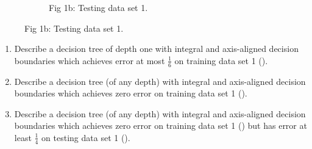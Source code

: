 \begin{enumerate}[font={\Large\bfseries},left=0pt]
\begin{Q}
\begin{figure}[h]
\begin{subfigure}{0.49\columnwidth}
                \caption{Fig 1b: Testing data set 1.}
                \label{fig: testing 1}
                \end{subfigure}
                \end{figure}
            \begin{enumerate}
              \item Describe a decision tree of depth one with integral
                and axis-aligned decision boundaries
                which achieves error at most $\frac 1 6$ on training data set 1 ().
              \item Describe a decision tree (of any depth) with integral
                and axis-aligned decision boundaries
                which achieves zero error on training data set 1 ().

              \item Describe a decision tree (of any depth) with integral
                and axis-aligned decision boundaries
                which achieves zero error on training data set 1 ()
                but has error at least $\frac 1 4$ on 
                testing data set 1 ().

                \clearpage
            

\end{enumerate}
\end{Q}
\end{enumerate}
